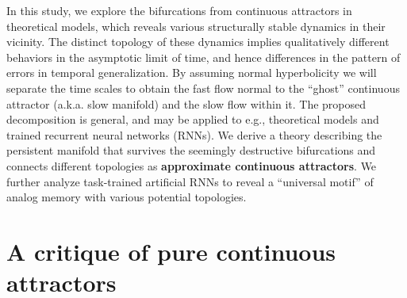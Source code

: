 \documentclass{article} %
\newcounter{ct}
\theoremstyle{definition}
\theoremstyle{remark}
\begin{document}
In this study, we explore the bifurcations from continuous attractors in theoretical models,
which reveals various structurally stable dynamics in their vicinity.
The distinct topology of these dynamics implies qualitatively different behaviors in the asymptotic limit of time, and hence differences in the pattern of errors in temporal generalization.
By assuming normal hyperbolicity we will separate the time scales to obtain the fast flow normal to the ``ghost'' continuous attractor (a.k.a. slow manifold) and the slow flow within it. The proposed decomposition is general, and may be applied to e.g., theoretical models and trained recurrent neural networks (RNNs).
We derive a theory describing the persistent manifold that survives the seemingly destructive bifurcations and connects different topologies as \textbf{approximate continuous attractors}.
We further analyze task-trained artificial RNNs to reveal a ``universal motif'' of analog memory with various potential topologies.



\section{A critique of pure continuous attractors}\label{sec:critique}
\end{document}
